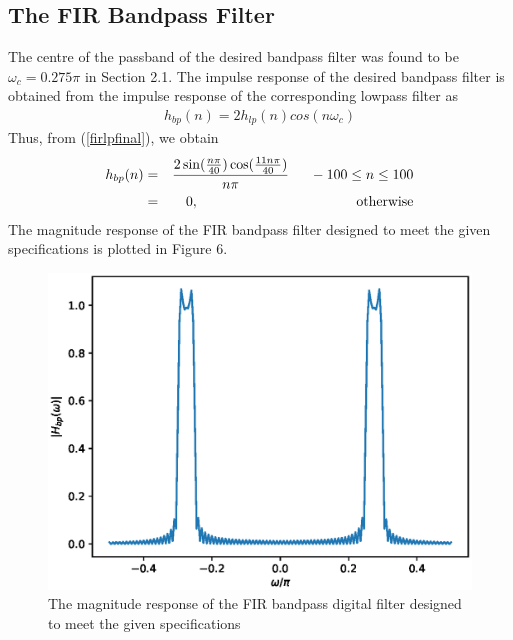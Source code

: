 \documentclass{article}
\begin{document}
\subsection{The FIR Bandpass Filter}
The centre of the passband of the desired bandpass filter was found to be $\omega_c = 0.275\pi$ in Section
2.1.  The impulse response of the desired bandpass filter is obtained from the impulse response of the
corresponding lowpass filter as
\begin{eqnarray}
h_{bp}(n) = 2h_{lp}(n)cos(n\omega_c)
\end{eqnarray}
Thus, from (\ref{firlpfinal}), we obtain
\begin{eqnarray}
\label{firbpfinal}
h_{bp}(n) &=& \frac{2\sin(\frac{n\pi}{40}) \cos(\frac{11n\pi}{40})}{n\pi} \indent -100 \leq n \leq 100 \nonumber \\
&=& 0, \hspace{4cm} \mbox{otherwise}
\end{eqnarray}
%
The magnitude response of the FIR bandpass filter designed to meet the given specifications is plotted in Figure 6.
\begin{figure}
\label{fig6}
\includegraphics[width = 15cm]{figs/fir/ee18btech11029_bandpass.eps}
\caption{The magnitude response of the FIR bandpass digital filter designed to meet the given specifications} 
\end{figure}
\end{document}

